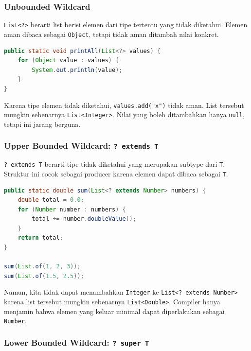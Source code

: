 \subsubsection{Unbounded Wildcard}

\begin{jawab}
\texttt{List<?>} berarti list berisi elemen dari tipe tertentu yang tidak diketahui. Elemen aman dibaca sebagai \texttt{Object}, tetapi tidak aman ditambah nilai konkret.
\end{jawab}

\begin{lstlisting}[language=Java, caption={Unbounded wildcard}, label={lst:unbounded-wildcard}]
public static void printAll(List<?> values) {
    for (Object value : values) {
        System.out.println(value);
    }
}
\end{lstlisting}

Karena tipe elemen tidak diketahui, \texttt{values.add("x")} tidak aman. List tersebut mungkin sebenarnya \texttt{List<Integer>}. Nilai yang boleh ditambahkan hanya \texttt{null}, tetapi ini jarang berguna.

\subsubsection{Upper Bounded Wildcard: \texttt{? extends T}}

\begin{jawab}
\texttt{? extends T} berarti tipe tidak diketahui yang merupakan subtype dari \texttt{T}. Struktur ini cocok sebagai producer karena elemen dapat dibaca sebagai \texttt{T}.
\end{jawab}

\begin{lstlisting}[language=Java, caption={Upper bounded wildcard untuk membaca number}, label={lst:upper-wildcard}]
public static double sum(List<? extends Number> numbers) {
    double total = 0.0;
    for (Number number : numbers) {
        total += number.doubleValue();
    }
    return total;
}

sum(List.of(1, 2, 3));
sum(List.of(1.5, 2.5));
\end{lstlisting}

Namun, kita tidak dapat menambahkan \texttt{Integer} ke \texttt{List<? extends Number>} karena list tersebut mungkin sebenarnya \texttt{List<Double>}. Compiler hanya menjamin bahwa elemen yang keluar minimal dapat diperlakukan sebagai \texttt{Number}.

\subsubsection{Lower Bounded Wildcard: \texttt{? super T}}

